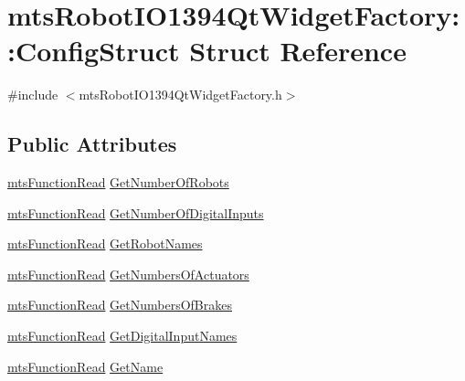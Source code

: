 \hypertarget{structmts_robot_i_o1394_qt_widget_factory_1_1_config_struct}{\section{mts\-Robot\-I\-O1394\-Qt\-Widget\-Factory\-:\-:Config\-Struct Struct Reference}
\label{structmts_robot_i_o1394_qt_widget_factory_1_1_config_struct}
}


{\ttfamily \#include $<$mts\-Robot\-I\-O1394\-Qt\-Widget\-Factory.\-h$>$}

\subsection*{Public Attributes}
\begin{DoxyCompactItemize}
\item 
\hyperlink{classmts_function_read}{mts\-Function\-Read} \hyperlink{structmts_robot_i_o1394_qt_widget_factory_1_1_config_struct_ad1307767b157207b98c7c168b722bfd3}{Get\-Number\-Of\-Robots}
\item 
\hyperlink{classmts_function_read}{mts\-Function\-Read} \hyperlink{structmts_robot_i_o1394_qt_widget_factory_1_1_config_struct_aa3d7624988a88f0de7f89216c77ff640}{Get\-Number\-Of\-Digital\-Inputs}
\item 
\hyperlink{classmts_function_read}{mts\-Function\-Read} \hyperlink{structmts_robot_i_o1394_qt_widget_factory_1_1_config_struct_a23dacd0bac2b78c3189369f05574f678}{Get\-Robot\-Names}
\item 
\hyperlink{classmts_function_read}{mts\-Function\-Read} \hyperlink{structmts_robot_i_o1394_qt_widget_factory_1_1_config_struct_ac42845bab8a99564d514ce80bbd75115}{Get\-Numbers\-Of\-Actuators}
\item 
\hyperlink{classmts_function_read}{mts\-Function\-Read} \hyperlink{structmts_robot_i_o1394_qt_widget_factory_1_1_config_struct_af94d75bc59d42e56fc3111524dfa2352}{Get\-Numbers\-Of\-Brakes}
\item 
\hyperlink{classmts_function_read}{mts\-Function\-Read} \hyperlink{structmts_robot_i_o1394_qt_widget_factory_1_1_config_struct_ae26b7957cc23fdba6892db0f94df95b1}{Get\-Digital\-Input\-Names}
\item 
\hyperlink{classmts_function_read}{mts\-Function\-Read} \hyperlink{structmts_robot_i_o1394_qt_widget_factory_1_1_config_struct_a8afb68d3670baa53512623e46d07e1af}{Get\-Name}
\end{DoxyCompactItemize}


